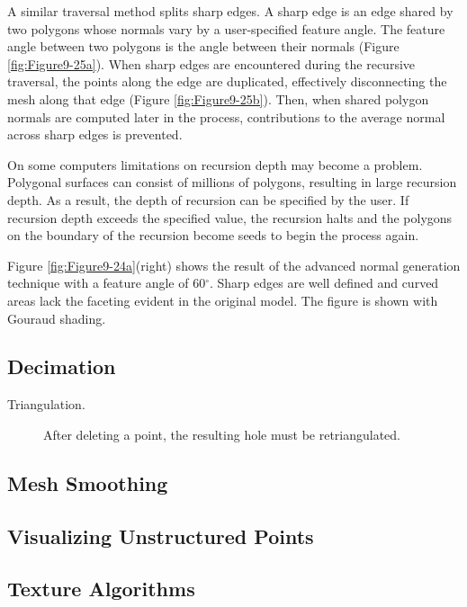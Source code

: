 A similar traversal method splits sharp edges. A sharp edge is an edge shared by two polygons whose normals vary by a user-specified feature angle. The feature angle between two polygons is the angle between their normals (Figure \ref{fig:Figure9-25a}). When sharp edges are encountered during the recursive traversal, the points along the edge are duplicated, effectively disconnecting the mesh along that edge (Figure \ref{fig:Figure9-25b}). Then, when shared polygon normals are computed later in the process, contributions to the average normal across sharp edges is prevented.

On some computers limitations on recursion depth may become a problem. Polygonal surfaces can consist of millions of polygons, resulting in large recursion depth. As a result, the depth of recursion can be specified by the user. If recursion depth exceeds the specified value, the recursion halts and the polygons on the boundary of the recursion become seeds to begin the process again.

Figure \ref{fig:Figure9-24a}(right) shows the result of the advanced normal generation technique with a feature angle of 60$^\circ$. Sharp edges are well defined and curved areas lack the faceting evident in the original model. The figure is shown with Gouraud shading.

\subsection{Decimation}

\begin{description}
	\item[Triangulation.] \label{subsec:decimation.triangulation} After deleting a point, the resulting hole must be retriangulated.
\end{description}

\subsection{Mesh Smoothing}
\label{subsec:mesh_smoothing}

\subsection{Visualizing Unstructured Points}
\label{subsec:visualizing_unstructured_points}

\subsection{Texture Algorithms}
\label{subsec:texture_algorithms}

